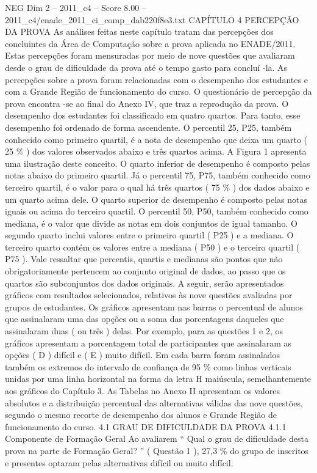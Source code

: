 \begin{textsample}{NEG Dim 2 – 2011\_c4 – Score 8.00 – 2011\_c4/enade\_2011\_ci\_comp\_dab220f8e3.txt}  \label{ex:f2_neg_314}
CAPÍTULO 4 PERCEPÇÃO DA PROVA As análises feitas neste capítulo tratam das percepções dos concluintes da Área de Computação sobre a prova aplicada no ENADE/2011.
Estas percepções foram mensuradas por meio de nove questões que avaliaram desde o grau de dificuldade da prova até o tempo gasto para concluí -la.
As percepções sobre a prova foram relacionadas com o desempenho dos estudantes e com a Grande Região de funcionamento do curso.
O questionário de percepção da prova encontra -se ao final do Anexo IV, que traz a reprodução da prova.
O desempenho dos estudantes foi classificado em quatro quartos.
Para tanto, esse desempenho foi ordenado de forma ascendente.
O percentil 25, P25, também conhecido como primeiro quartil, é a nota de desempenho que deixa um quarto ( 25 \% ) dos valores observados abaixo e três quartos acima.
A Figura 1 apresenta uma ilustração deste conceito.
O quarto inferior de desempenho é composto pelas notas abaixo do primeiro quartil.
Já o percentil 75, P75, também conhecido como terceiro quartil, é o valor para o qual há três quartos ( 75 \% ) dos dados abaixo e um quarto acima dele.
O quarto superior de desempenho é composto pelas notas iguais ou acima do terceiro quartil.
O percentil 50, P50, também conhecido como mediana, é o valor que divide as notas em dois conjuntos de igual tamanho.
O segundo quarto inclui valores entre o primeiro quartil ( P25 ) e a mediana.
O terceiro quarto contém os valores entre a mediana ( P50 ) e o terceiro quartil ( P75 ).
Vale ressaltar que percentis, quartis e medianas são pontos que não obrigatoriamente pertencem ao conjunto original de dados, ao passo que os quartos são subconjuntos dos dados originais.
A seguir, serão apresentados gráficos com resultados selecionados, relativos às nove questões avaliadas por grupos de estudantes.
Os gráficos apresentam nas barras o percentual de alunos que assinalaram uma das opções ou a soma das porcentagens daqueles que assinalaram duas ( ou três ) delas.
Por exemplo, para as questões 1 e 2, os gráficos apresentam a porcentagem total de participantes que assinalaram as opções ( D ) difícil e ( E ) muito difícil.
Em cada barra foram assinalados também os extremos do intervalo de confiança de 95 \% como linhas verticais unidas por uma linha horizontal na forma da letra H maiúscula, semelhantemente aos gráficos do Capítulo 3.
As Tabelas no Anexo II apresentam os valores absolutos e a distribuição percentual das alternativas válidas das nove questões, segundo o mesmo recorte de desempenho dos alunos e Grande Região de funcionamento do curso. 4.1 GRAU DE DIFICULDADE DA PROVA 4.1.1 Componente de Formação Geral Ao avaliarem “ Qual o grau de dificuldade desta prova na parte de Formação Geral? ” ( Questão 1 ), 27,3 \% do grupo de inscritos e presentes optaram pelas alternativas difícil ou muito difícil.

\end{textsample}
